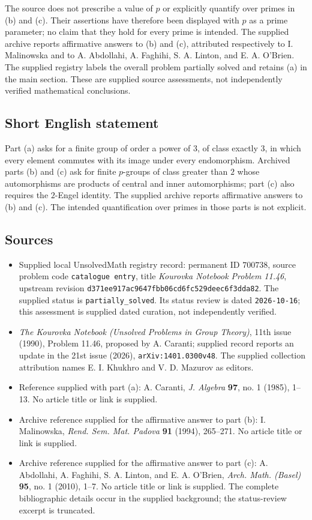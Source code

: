 \documentclass[11pt]{article}
\begin{document}
The source does not prescribe a value of \(p\) or explicitly quantify over primes in (b) and (c). Their assertions have therefore been displayed with \(p\) as a prime parameter; no claim that they hold for every prime is intended. The supplied archive reports affirmative answers to (b) and (c), attributed respectively to I. Malinowska and to A. Abdollahi, A. Faghihi, S. A. Linton, and E. A. O'Brien. The supplied registry labels the overall problem partially solved and retains (a) in the main section. These are supplied source assessments, not independently verified mathematical conclusions.
\subsection{Short English statement}
Part (a) asks for a finite group of order a power of \(3\), of class exactly \(3\), in which every element commutes with its image under every endomorphism. Archived parts (b) and (c) ask for finite \(p\)-groups of class greater than \(2\) whose automorphisms are products of central and inner automorphisms; part (c) also requires the \(2\)-Engel identity. The supplied archive reports affirmative answers to (b) and (c). The intended quantification over primes in those parts is not explicit.
\subsection{Sources}
\begin{itemize}
\item Supplied local UnsolvedMath registry record: permanent ID \(700738\), source problem code \texttt{catalogue entry}, title \emph{Kourovka Notebook Problem 11.46}, upstream revision \texttt{d371ee917ac9647fbb06cd6fc529deec6f3dda82}. The supplied status is \texttt{partially\_solved}. Its status review is dated \texttt{2026-10-16}; this assessment is supplied dated curation, not independently verified.
\item \emph{The Kourovka Notebook (Unsolved Problems in Group Theory)}, 11th issue (1990), Problem 11.46, proposed by A. Caranti; supplied record reports an update in the 21st issue (2026), \texttt{arXiv:1401.0300v48}. The supplied collection attribution names E. I. Khukhro and V. D. Mazurov as editors.
\item Reference supplied with part (a): A. Caranti, \emph{J. Algebra} \textbf{97}, no. 1 (1985), 1--13. No article title or link is supplied.
\item Archive reference supplied for the affirmative answer to part (b): I. Malinowska, \emph{Rend. Sem. Mat. Padova} \textbf{91} (1994), 265--271. No article title or link is supplied.
\item Archive reference supplied for the affirmative answer to part (c): A. Abdollahi, A. Faghihi, S. A. Linton, and E. A. O'Brien, \emph{Arch. Math. (Basel)} \textbf{95}, no. 1 (2010), 1--7. No article title or link is supplied. The complete bibliographic details occur in the supplied background; the status-review excerpt is truncated.
\end{itemize}
\end{document}
